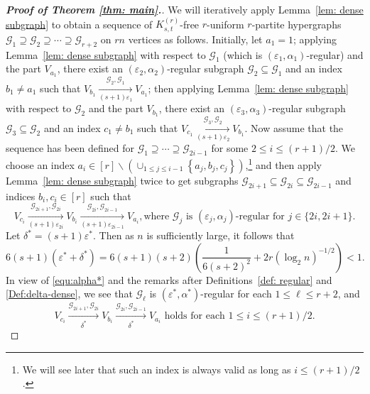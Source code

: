 \documentclass[11pt]{article}
\begin{document}
\begin{proof}[\bf Proof of Theorem \ref{thm: main}.]
We will iteratively apply Lemma~\ref{lem: dense subgraph} to obtain a sequence of
$K_{s,t}^{(r)}$-free $r$-uniform $r$-partite hypergraphs $\mathcal G_1\supseteq \mathcal G_2 \supseteq \cdots \supseteq \mathcal G_{r+2}$ on $rn$ vertices as follows.
Initially, let $a_1=1$; applying Lemma~\ref{lem: dense subgraph} with respect to $\mathcal G_1$ (which is $\left(\varepsilon_1,\alpha_1\right)$-regular) and the part $V_{a_1}$, there exist an $(\varepsilon_2,\alpha_2)$-regular subgraph $\mathcal G_2\subseteq \mathcal G_1$ and an index $b_1\neq a_1$ such that
$V_{b_1} \xrightarrow[(s+1)\varepsilon_1]{\mathcal G_2, \mathcal G_1 } V_{a_1}$;
then applying Lemma~\ref{lem: dense subgraph} with respect to $\mathcal G_2$ and the part $V_{b_1}$,
there exist an $(\varepsilon_3,\alpha_3)$-regular subgraph $\mathcal G_3\subseteq \mathcal G_2$ and an index $c_1\neq b_1$ such that
$V_{c_1} \xrightarrow[(s+1)\varepsilon_2]{\mathcal G_3, \mathcal G_2 } V_{b_1}$.
Now assume that the sequence has been defined for $\mathcal G_1\supseteq \cdots \supseteq \mathcal G_{2i-1}$ for some $2\leq i\leq (r+1)/2$.
We choose an index $a_i\in [r]\backslash \left(\cup_{1\leq j\leq i-1} \left\{a_j,b_j,c_j\right\}\right)$,\footnote{We will see later that such an index is always valid as long as $i\leq (r+1)/2$.}
and then apply Lemma~\ref{lem: dense subgraph} twice to get subgraphs $\mathcal G_{2i+1}\subseteq \mathcal G_{2i}\subseteq \mathcal G_{2i-1}$ and indices $b_i, c_i\in [r]$ such that
$$V_{c_i} \xrightarrow[(s+1)\varepsilon_{2i}]{\mathcal G_{2i+1}, \mathcal G_{2i} } V_{b_i} \xrightarrow[(s+1)\varepsilon_{2i-1}]{\mathcal G_{2i}, \mathcal G_{2i-1} } V_{a_i}, \mbox{where $\mathcal G_{j}$ is $(\varepsilon_{j},\alpha_{j})$-regular for } j\in \{2i, 2i+1\}.$$
Let $\delta^*=(s+1)\varepsilon^*$.
Then as $n$ is sufficiently large, it follows that
\begin{equation}\label{equ:eps+del}
6(s+1)(\varepsilon^* + \delta^*)=6(s+1)(s+2)\left(\frac{1}{6(s+2)^2}+2r(\log_2 n)^{-1/2}\right)<1.
\end{equation}
In view of \eqref{equ:alpha*} and the remarks after Definitions~\ref{def: regular} and \ref{Def:delta-dense},
we see that $\mathcal G_\ell$ is $(\varepsilon^*,\alpha^*)$-regular for each $1\leq \ell \leq r+2$,
and
\begin{equation}\label{equ:ci->ai}
V_{c_i} \xrightarrow[\delta^*]{\mathcal G_{2i+1}, \mathcal G_{2i} } V_{b_i} \xrightarrow[\delta^*]{\mathcal G_{2i}, \mathcal G_{2i-1} } V_{a_i} \mbox{ holds for each } 1\leq i\leq (r+1)/2.
\end{equation}


\end{proof}
\end{document}
